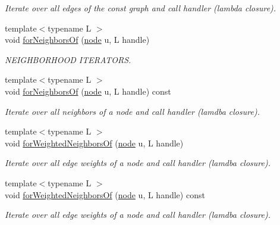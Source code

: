 \begin{DoxyCompactItemize}
\begin{DoxyCompactList}\small\item\em Iterate over all edges of the const graph and call handler (lambda closure). \end{DoxyCompactList}\item 
{\footnotesize template$<$typename L $>$ }\\void \hyperlink{class_networ_kit_1_1_graph_a7b0d575c9fa66d075bd6d81c1593f081}{for\-Neighbors\-Of} (\hyperlink{namespace_networ_kit_a53fe3e4fd04ea024160e4d024dfebadf}{node} u, L handle)
\begin{DoxyCompactList}\small\item\em N\-E\-I\-G\-H\-B\-O\-R\-H\-O\-O\-D I\-T\-E\-R\-A\-T\-O\-R\-S. \end{DoxyCompactList}\item 
{\footnotesize template$<$typename L $>$ }\\void \hyperlink{class_networ_kit_1_1_graph_a87e7e61da8108f72de37893f8a2a7c4d}{for\-Neighbors\-Of} (\hyperlink{namespace_networ_kit_a53fe3e4fd04ea024160e4d024dfebadf}{node} u, L handle) const 
\begin{DoxyCompactList}\small\item\em Iterate over all neighbors of a node and call handler (lamdba closure). \end{DoxyCompactList}\item 
{\footnotesize template$<$typename L $>$ }\\void \hyperlink{class_networ_kit_1_1_graph_a62c59e656987e72e2386a70635e978e1}{for\-Weighted\-Neighbors\-Of} (\hyperlink{namespace_networ_kit_a53fe3e4fd04ea024160e4d024dfebadf}{node} u, L handle)
\begin{DoxyCompactList}\small\item\em Iterate over all edge weights of a node and call handler (lamdba closure). \end{DoxyCompactList}\item 
{\footnotesize template$<$typename L $>$ }\\void \hyperlink{class_networ_kit_1_1_graph_af94709f5bb5ee071d5d1e0b4292db525}{for\-Weighted\-Neighbors\-Of} (\hyperlink{namespace_networ_kit_a53fe3e4fd04ea024160e4d024dfebadf}{node} u, L handle) const 
\begin{DoxyCompactList}\small\item\em Iterate over all edge weights of a node and call handler (lamdba closure). \end{DoxyCompactList}\item 

\end{DoxyCompactItemize}
